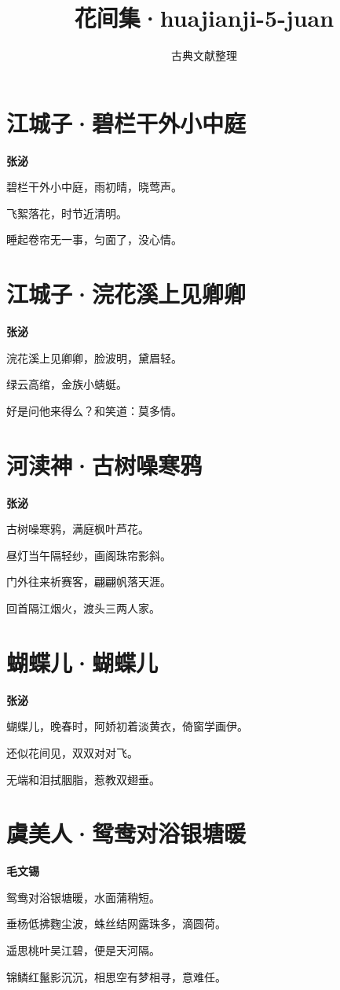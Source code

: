 \documentclass[12pt,a4paper]{ctexbook}
\title{花间集·huajianji-5-juan}
\author{古典文献整理}
\date{}
\begin{document}
\maketitle
\tableofcontents
\newpage
\section{江城子·碧栏干外小中庭}
\textbf{张泌}\par\vspace{0.5em}
碧栏干外小中庭，雨初晴，晓莺声。\par
飞絮落花，时节近清明。\par
睡起卷帘无一事，匀面了，没心情。\par

\section{江城子·浣花溪上见卿卿}
\textbf{张泌}\par\vspace{0.5em}
浣花溪上见卿卿，脸波明，黛眉轻。\par
绿云高绾，金族小蜻蜓。\par
好是问他来得么？和笑道：莫多情。\par

\section{河渎神·古树噪寒鸦}
\textbf{张泌}\par\vspace{0.5em}
古树噪寒鸦，满庭枫叶芦花。\par
昼灯当午隔轻纱，画阁珠帘影斜。\par
门外往来祈赛客，翩翩帆落天涯。\par
回首隔江烟火，渡头三两人家。\par

\section{蝴蝶儿·蝴蝶儿}
\textbf{张泌}\par\vspace{0.5em}
蝴蝶儿，晚春时，阿娇初着淡黄衣，倚窗学画伊。\par
还似花间见，双双对对飞。\par
无端和泪拭胭脂，惹教双翅垂。\par

\section{虞美人·鸳鸯对浴银塘暖}
\textbf{毛文锡}\par\vspace{0.5em}
鸳鸯对浴银塘暖，水面蒲稍短。\par
垂杨低拂麴尘波，蛛丝结网露珠多，滴圆荷。\par
遥思桃叶吴江碧，便是天河隔。\par
锦鳞红鬣影沉沉，相思空有梦相寻，意难任。\par
\end{document}
